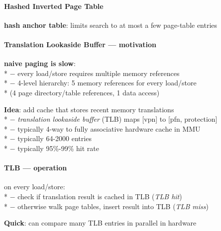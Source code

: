 \paragraph{Hashed Inverted Page Table}
\begin{items}
  \item \textbf{hash anchor table}: limits search to at most a few page-table entries
\end{items}

\paragraph{Translation Lookaside Buffer --- motivation}
\begin{items}
  \item \textbf{naive paging is slow}: \\*
    $ - $ every load/store requires multiple memory references \\*
    $ - $ 4-level hierarchy: 5 memory references for every load/store \\* \phantom{$ - $} \phantom{$ \cdot $} (4 page directory/table references, 1 data access)
  \item \textbf{Idea}: add cache that stores recent memory translations \\*
    $ - $ \emph{translation lookaside buffer} (TLB) maps [vpn] to [pfn, protection] \\*
    $ - $ typically 4-way to fully associative hardware cache in MMU \\*
    $ - $ typically 64-2000 entries \\*
    $ - $ typically 95\%-99\% hit rate
\end{items}

\paragraph{TLB --- operation}
\begin{items}
  \item on every load/store: \\*
    $ - $ check if translation result is cached in TLB (\emph{TLB hit}) \\*
    $ - $ otherwise walk page tables, insert result into TLB (\emph{TLB miss})
  \item \textbf{Quick}: can compare many TLB entries in parallel in hardware
\end{items}

